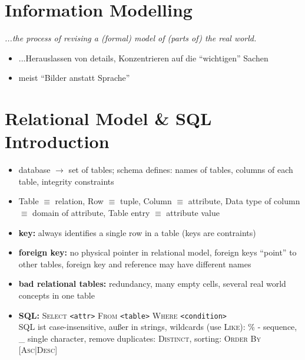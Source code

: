 \documentclass{scrartcl}
\begin{document}
\section*{Information Modelling}
\textit{...the process of revising a (formal) model of (parts of) the real world.}
\begin{itemize}
	\item ...Herauslassen von details, Konzentrieren auf die "`wichtigen"' Sachen
	\item meist "`Bilder anstatt Sprache"'
\end{itemize}

\section*{Relational Model \& SQL Introduction}
\begin{itemize}
	\item  database $\to$ set of tables; schema defines: names of tables, columns of each table, integrity constraints
	\item Table $\equiv$ relation,  Row $\equiv$ tuple, Column $\equiv$ attribute, Data type of column $\equiv$ domain of attribute, Table entry $\equiv$ attribute value
	\item \textbf{key:} always identifies a single row in a table (keys are contraints)
	\item \textbf{foreign key:} no physical pointer in relational model, foreign keys "`point"' to other tables, foreign key and reference may have different names
	\item \textbf{bad relational tables:} redundancy, many empty cells, several real world concepts in one table
	\item \textbf{SQL:} \textsc{Select} \texttt{<attr>} \textsc{From} \texttt{<table>} \textsc{Where} \texttt{<condition>} \\ SQL ist case-insensitive, außer in strings, wildcards (use \textsc{Like)}: \% - sequence, \_ single character, remove duplicates: \textsc{Distinct}, sorting: \textsc{Order By [Asc|Desc]}
\end{itemize}
\end{document}
